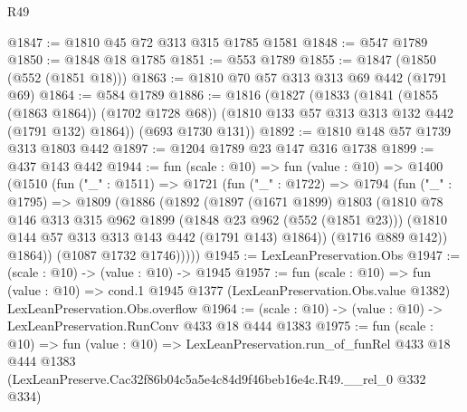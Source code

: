 \begin{lexlean}{R49}
\begin{coremodule}
@1847 := @1810 @45 @72 @313 @315 @1785 @1581
@1848 := @547 @1789
@1850 := @1848 @18 @1785
@1851 := @553 @1789
@1855 := @1847 (@1850 (@552 (@1851 @18)))
@1863 := @1810 @70 @57 @313 @313 @69 @442 (@1791 @69)
@1864 := @584 @1789
@1886 := @1816
    (@1827
      (@1833
        (@1841 (@1855 (@1863 @1864)) (@1702 @1728 @68))
        (@1810 @133 @57 @313 @313 @132 @442 (@1791 @132) @1864))
      (@693 @1730 @131))
@1892 := @1810 @148 @57 @1739 @313 @1803 @442
@1897 := @1204 @1789 @23 @147 @316 @1738
@1899 := @437 @143 @442
@1944 := fun (scale : @10) =>
  fun (value : @10) =>
  @1400
    (@1510
      (fun ("_" : @1511) =>
      @1721
        (fun ("_" : @1722) =>
        @1794
          (fun ("_" : @1795) =>
          @1809
            (@1886
              (@1892
                (@1897
                  (@1671 @1899)
                  @1803
                  (@1810
                    @78
                    @146
                    @313
                    @315
                    @962
                    @1899
                    (@1848 @23 @962 (@552 (@1851 @23)))
                    (@1810 @144 @57 @313 @313 @143 @442 (@1791 @143) @1864))
                  (@1716 @889 @142))
                @1864))
            (@1087 @1732 @1746)))))
@1945 := LexLeanPreservation.Obs
@1947 := (scale : @10) -> (value : @10) -> @1945
@1957 := fun (scale : @10) =>
  fun (value : @10) =>
  cond.{1} @1945 @1377 (LexLeanPreservation.Obs.value @1382) LexLeanPreservation.Obs.overflow
@1964 := (scale : @10) -> (value : @10) -> LexLeanPreservation.RunConv @433 @18 @444 @1383
@1975 := fun (scale : @10) =>
  fun (value : @10) =>
  LexLeanPreservation.run_of_funRel
    @433
    @18
    @444
    @1383
    (LexLeanPreserve.Cac32f86b04c5a5e4c84d9f46beb16e4c.R49.__rel_0 @332 @334)
\end{coremodule}
\end{lexlean}
